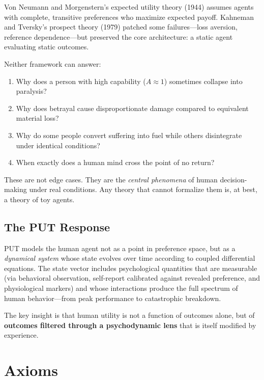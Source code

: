 \documentclass[12pt, a4paper]{article}
\theoremstyle{remark}
\begin{document}
Von Neumann and Morgenstern's expected utility theory (1944) assumes agents
with complete, transitive preferences who maximize expected payoff. Kahneman
and Tversky's prospect theory (1979) patched some failures---loss aversion,
reference dependence---but preserved the core architecture: a static agent
evaluating static outcomes.

Neither framework can answer:

\begin{enumerate}[label=(\roman*)]
    \item Why does a person with high capability ($A \approx 1$) sometimes
          collapse into paralysis?
    \item Why does betrayal cause disproportionate damage compared to
          equivalent material loss?
    \item Why do some people convert suffering into fuel while others
          disintegrate under identical conditions?
    \item When exactly does a human mind cross the point of no return?
\end{enumerate}

These are not edge cases. They are the \emph{central phenomena} of human
decision-making under real conditions. Any theory that cannot formalize
them is, at best, a theory of toy agents.

\subsection{The PUT Response}

PUT models the human agent not as a point in preference space, but as a
\emph{dynamical system} whose state evolves over time according to coupled
differential equations. The state vector includes psychological quantities
that are measurable (via behavioral observation, self-report calibrated
against revealed preference, and physiological markers) and whose
interactions produce the full spectrum of human behavior---from peak
performance to catastrophic breakdown.

The key insight is that human utility is not a function of outcomes alone,
but of \textbf{outcomes filtered through a psychodynamic lens} that is
itself modified by experience.

\section{Axioms}
\end{document}
